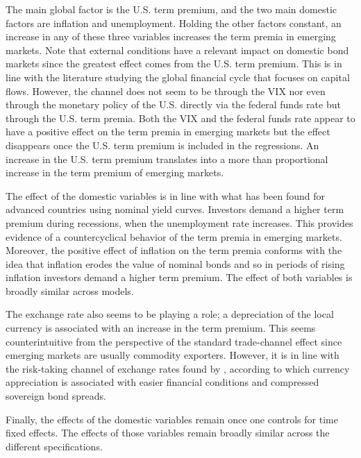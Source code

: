 {The main global factor is the U.S. term premium, and the two main domestic factors are inflation and unemployment. Holding the other factors constant, an increase in any of these three variables increases the term premia in emerging markets. Note that external conditions have a relevant impact on domestic bond markets since the greatest effect comes from the U.S. term premium. This is in line with the literature studying the global financial cycle that focuses on capital flows. However, the channel does not seem to be through the VIX nor even through the monetary policy of the U.S. directly via the federal funds rate but through the U.S. term premia. Both the VIX and the federal funds rate appear to have a positive effect on the term premia in emerging markets but the effect disappears once the U.S. term premium is included in the regressions. An increase in the U.S. term premium translates into a more than proportional increase in the term premium of emerging markets.

The effect of the domestic variables is in line with what has been found for advanced countries using nominal yield curves. Investors demand a higher term premium during recessions, when the unemployment rate increases. This provides evidence of a countercyclical behavior of the term premia in emerging markets. Moreover, the positive effect of inflation on the term premia conforms with the idea that inflation erodes the value of nominal bonds and so in periods of rising inflation investors demand a higher term premium. The effect of both variables is broadly similar across models. 

The exchange rate also seems to be playing a role; a depreciation of the local currency is associated with an increase in the term premium. This seems counterintuitive from the perspective of the standard trade-channel effect since emerging markets are usually commodity exporters. However, it is in line with the risk-taking channel of exchange rates found by \cite{HofmannShimShin:2017}, according to which currency appreciation is associated with easier financial conditions and compressed sovereign bond spreads.

Finally, the effects of the domestic variables remain once one controls for time fixed effects. The effects of those variables remain broadly similar across the different specifications.

}{}	%


